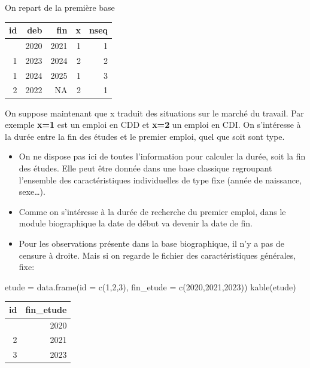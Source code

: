 \documentclass[
  12pt,
  letterpaper,
  DIV=11,
  numbers=noendperiod,
  onepage,
  openany]{scrreprt}
\newenvironment{Shaded}{\begin{snugshade}}{\end{snugshade}}
\newcommand{\AttributeTok}[1]{\textcolor[rgb]{0.80,0.80,0.80}{#1}}
\newcommand{\DecValTok}[1]{\textcolor[rgb]{0.86,0.86,0.80}{#1}}
\newcommand{\FunctionTok}[1]{\textcolor[rgb]{0.94,0.94,0.56}{#1}}
\newcommand{\NormalTok}[1]{\textcolor[rgb]{0.80,0.80,0.80}{#1}}
\newcommand{\OtherTok}[1]{\textcolor[rgb]{0.94,0.94,0.56}{#1}}
\providecommand{\tightlist}{%
  \setlength{\itemsep}{0pt}\setlength{\parskip}{0pt}}\usepackage{longtable,booktabs,array}
\begin{document}
On repart de la première base

\begin{longtable}[]{@{}rrrrr@{}}
\toprule\noalign{}
id & deb & fin & x & nseq \\
\midrule\noalign{}
\endhead
\bottomrule\noalign{}
\endlastfoot
1 & 2020 & 2021 & 1 & 1 \\
1 & 2023 & 2024 & 2 & 2 \\
1 & 2024 & 2025 & 1 & 3 \\
2 & 2022 & NA & 2 & 1 \\
\end{longtable}

On suppose maintenant que x traduit des situations sur le marché du
travail. Par exemple \textbf{x=1} est un emploi en CDD et \textbf{x=2}
un emploi en CDI. On s'intéresse à la durée entre la fin des études et
le premier emploi, quel que soit sont type.

\begin{itemize}
\tightlist
\item
  On ne dispose pas ici de toutes l'information pour calculer la durée,
  soit la fin des études. Elle peut être donnée dans une base classique
  regroupant l'ensemble des caractéristiques individuelles de type fixe
  (année de naissance, sexe\ldots).
\item
  Comme on s'intéresse à la durée de recherche du premier emploi, dans
  le module biographique la date de début va devenir la date de fin.
\item
  Pour les observations présente dans la base biographique, il n'y a pas
  de censure à droite. Mais si on regarde le fichier des
  caractéristiques générales, fixe:
\end{itemize}

\begin{Shaded}
\begin{Highlighting}[]
\NormalTok{etude }\OtherTok{=} \FunctionTok{data.frame}\NormalTok{(}\AttributeTok{id =} \FunctionTok{c}\NormalTok{(}\DecValTok{1}\NormalTok{,}\DecValTok{2}\NormalTok{,}\DecValTok{3}\NormalTok{), }\AttributeTok{fin\_etude =} \FunctionTok{c}\NormalTok{(}\DecValTok{2020}\NormalTok{,}\DecValTok{2021}\NormalTok{,}\DecValTok{2023}\NormalTok{))}
\FunctionTok{kable}\NormalTok{(etude)}
\end{Highlighting}
\end{Shaded}

\begin{longtable}[]{@{}rr@{}}
\toprule\noalign{}
id & fin\_etude \\
\midrule\noalign{}
\endhead
\bottomrule\noalign{}
\endlastfoot
1 & 2020 \\
2 & 2021 \\
3 & 2023 \\
\end{longtable}
\end{document}
